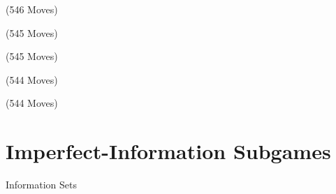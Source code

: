 \documentclass{beamer}
\theoremstyle{definition}
\begin{document}
{    \begin{frame}{\chessTitle (546 Moves)}
      \begin{figure}[H]
        \centering
        \showboard
      \end{figure}
    \end{frame}

    \begin{frame}{\chessTitle (545 Moves)}
      \begin{figure}[H]
        \centering
        \showboard
      \end{figure}
    \end{frame}

    \begin{frame}{\chessTitle (545 Moves)}
      \begin{figure}[H]
        \centering
        \showboard
      \end{figure}
    \end{frame}

    \begin{frame}{\chessTitle (544 Moves)}
      \begin{figure}[H]
        \centering
        \showboard
      \end{figure}
    \end{frame}

    \begin{frame}{\chessTitle (544 Moves)}
      \begin{figure}[H]
        \centering
        \showboard
      \end{figure}
    \end{frame}
  }

  \section{Imperfect-Information Subgames}
  \begin{frame}{Information Sets}
    \pause
    \begin{figure}[H]
      \centering
      \scriptsize
      \def\svgwidth{.65\textwidth}
      
    \end{figure}
  \end{frame}
\end{document}
